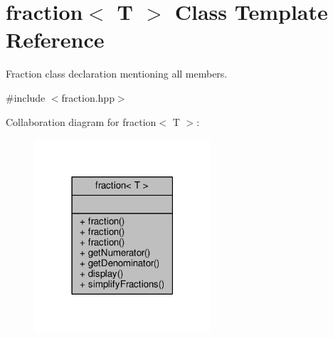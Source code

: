 \hypertarget{classfraction}{}\section{fraction$<$ T $>$ Class Template Reference}
\label{classfraction}


Fraction class declaration mentioning all members.  




{\ttfamily \#include $<$fraction.\+hpp$>$}



Collaboration diagram for fraction$<$ T $>$\+:
\nopagebreak
\begin{figure}[H]
\begin{center}
\leavevmode
\includegraphics[width=186pt]{classfraction__coll__graph}
\end{center}
\end{figure}
